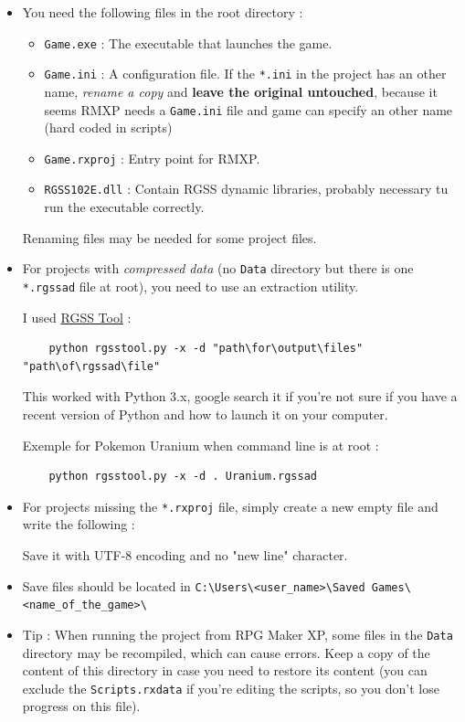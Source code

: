 \documentclass[11pt]{article}
\begin{document}
\begin{itemize}
	\item You need the following files in the root directory :
	
	\begin{itemize}
		\item \verb|Game.exe| : The executable that launches the game.
		\item \verb|Game.ini| : A configuration file. If the \verb|*.ini| in the project has an other name, \textit{rename a copy} and \textbf{leave the original untouched}, because it seems RMXP needs a \verb|Game.ini| file and game can specify an other name (hard coded in scripts)
		\item \verb|Game.rxproj| : Entry point for RMXP.
		\item \verb|RGSS102E.dll| : Contain RGSS dynamic libraries, probably necessary tu run the executable correctly.
	\end{itemize}

	Renaming files may be needed for some project files.
	
	\item For projects with \textit{compressed data} (no \verb|Data| directory but there is one \verb|*.rgssad| file at root), you need to use an extraction utility.
	
	I used \href{https://gitlab.com/rgss/rgsstool}{RGSS Tool} :
	
	\begin{lstlisting}
	python rgsstool.py -x -d "path\for\output\files" "path\of\rgssad\file"\end{lstlisting}
	\vspace{-8mm}
	
	This worked with Python 3.x, google search it if you're not sure if you have a recent version of Python and how to launch it on your computer.
	
	Exemple for Pokemon Uranium when command line is at root :
	
	\begin{lstlisting}
	python rgsstool.py -x -d . Uranium.rgssad\end{lstlisting}
	\vspace{-6mm}
	
	\item For projects missing the \verb|*.rxproj| file, simply create a new empty file and write the following : 
	
	
	Save it with UTF-8 encoding and no "new line" character.
	
	\item Save files should be located in \verb|C:\Users\<user_name>\Saved Games\<name_of_the_game>\|
	
	\item Tip : When running the project from RPG Maker XP, some files in the \verb|Data| directory may be recompiled, which can cause errors. Keep a copy of the content of this directory in case you need to restore its content (you can exclude the \verb|Scripts.rxdata| if you're editing the scripts, so you don't lose progress on this file).
\end{itemize}
\end{document}

